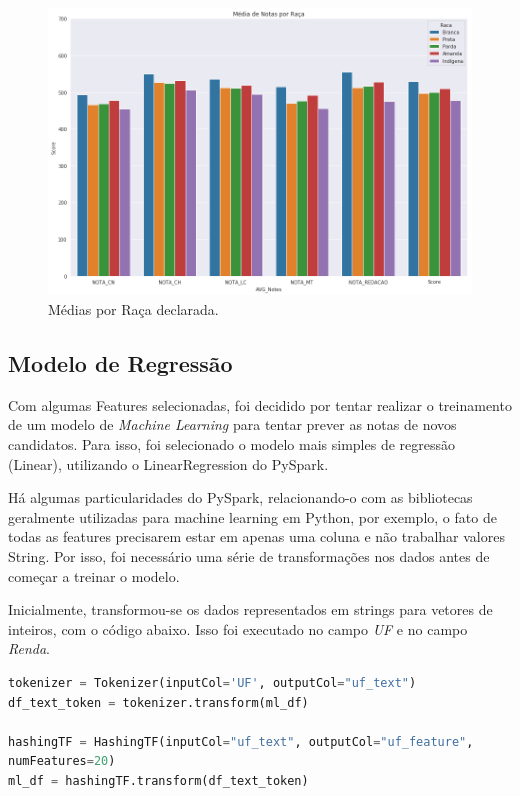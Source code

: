 \documentclass{article}
\begin{document}
\begin{figure}[H]
\centering
  \includegraphics[width=0.8 \linewidth]{img/mean_by_raca.png}
  \caption{Médias por Raça declarada.}
  \label{fig:mean_by_raca}
\end{figure}


\subsection{Modelo de Regressão}

Com algumas Features selecionadas, foi decidido por tentar realizar o treinamento de um modelo de \emph{Machine Learning} para tentar prever as notas de novos candidatos. Para isso, foi selecionado o modelo mais simples de regressão (Linear), utilizando o LinearRegression do PySpark.

Há algumas particularidades do PySpark, relacionando-o com as bibliotecas geralmente utilizadas para machine learning em Python, por exemplo, o fato de todas as features precisarem estar em apenas uma coluna e não trabalhar valores String. Por isso, foi necessário uma série de transformações nos dados antes de começar a treinar o modelo.

Inicialmente, transformou-se os dados representados em strings para vetores de inteiros, com o código abaixo.
Isso foi executado no campo \emph{UF} e no campo \emph{Renda}.

\begin{lstlisting}[caption= {Transformação de dados String.},captionpos=b, language=python]
tokenizer = Tokenizer(inputCol='UF', outputCol="uf_text")
df_text_token = tokenizer.transform(ml_df)

hashingTF = HashingTF(inputCol="uf_text", outputCol="uf_feature",
numFeatures=20)
ml_df = hashingTF.transform(df_text_token)
\end{lstlisting}
\end{document}
